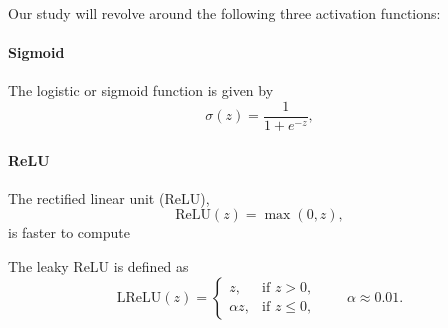 Our study will revolve around the following three activation functions:

\paragraph{Sigmoid} The logistic or sigmoid function is given by
\begin{equation*}\label{eq:sigmoid}
    \sigma(z) = \frac{1}{1+e^{-z}},
\end{equation*}


\paragraph{ReLU} The rectified linear unit (ReLU),
\begin{equation*}\label{eq:relu}
    \mathrm{ReLU}(z) = \max (0, z),
\end{equation*}
is faster to compute

The leaky ReLU is defined as
\begin{equation*}\label{eq:leaky-relu}
    \mathrm{LReLU}(z) =
    \begin{cases}
        z, & \text{if } z > 0, \\
        \alpha z, & \text{if } z \leq 0,
    \end{cases}
    \qquad \alpha \approx 0.01.
\end{equation*}
